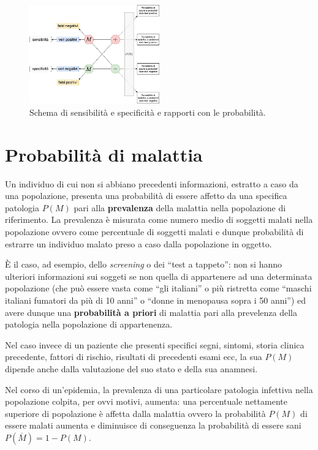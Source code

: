 \documentclass[11pt]{article}
\begin{document}
    \begin{figure}
\centering
    \includegraphics[width=0.5\textwidth,height=0.5\textheight,keepaspectratio]{se-sp}
    \caption{Schema di sensibilità e specificità e rapporti con le probabilità.}
    \label{fig:se-sp}
\end{figure}

    \hypertarget{probabilituxe0-di-malattia}{%
\section{Probabilità di malattia}\label{probabilituxe0-di-malattia}}

Un individuo di cui non si abbiano precedenti informazioni, estratto a
caso da una popolazione, presenta una probabilità di essere affetto da
una specifica patologia \(P(M)\) pari alla \textbf{prevalenza} della
malattia nella popolazione di riferimento. La prevalenza è misurata come
numero medio di soggetti malati nella popolazione ovvero come
percentuale di soggetti malati e dunque probabilità di estrarre un
individuo malato preso a caso dalla popolazione in oggetto.

È il caso, ad esempio, dello \emph{screening} o dei ``test a tappeto'':
non si hanno ulteriori informazioni sui soggeti se non quella di
appartenere ad una determinata popolazione (che può essere vasta come
``gli italiani'' o più ristretta come ``maschi italiani fumatori da più
di 10 anni'' o ``donne in menopausa sopra i 50 anni'') ed avere dunque
una \textbf{probabilità a priori} di malattia pari alla prevelenza della
patologia nella popolazione di appartenenza.

Nel caso invece di un paziente che presenti specifici segni, sintomi,
storia clinica precedente, fattori di rischio, risultati di precedenti
esami ecc, la sua \(P(M)\) dipende anche dalla valutazione del suo stato
e della sua anamnesi.

Nel corso di un'epidemia, la prevalenza di una particolare patologia
infettiva nella popolazione colpita, per ovvi motivi, aumenta: una
percentuale nettamente superiore di popolazione è affetta dalla malattia
ovvero la probabilità \(P(M)\) di essere malati aumenta e diminuisce di
conseguenza la probabilità di essere sani
\(P(\overline{M}) = 1 - P(M)\).
\end{document}
